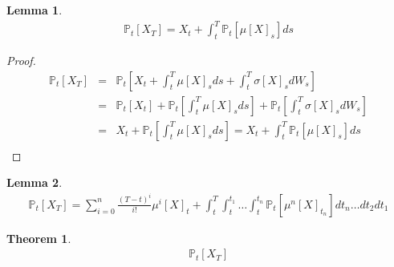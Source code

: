 \documentclass{article}
\newtheorem{thm}{Theorem}
\newtheorem{lem}{Lemma}
\newcommand{\bra}[1]{\left[#1\right]}
\renewcommand{\P}[1]{\mathbb{P}_t\bra{#1}}
\newcommand{\mub}[1]{\mu\bra{#1}}
\newcommand{\mun}[2]{\mu^{#1}\bra{#2}}
\newcommand{\sigmab}[1]{\sigma\bra{#1}}
\begin{document}
\begin{lem}
  \begin{eqnarray*}
    \P{X_T} = X_t + \int_t^T\P{\mub{X}_s}ds
  \end{eqnarray*}
\end{lem}
\begin{proof}
  \begin{eqnarray*}
    \P{X_T} & = & \P{X_t + \int_t^T \mub{X}_s ds + \int_t^T\sigmab{X}_s dW_s}\\
    & = & \P{X_t} + \P{\int_t^T \mub{X}_s ds} + \P{\int_t^T\sigmab{X}_s dW_s}\\
    & = & X_t + \P{\int_t^T \mub{X}_s ds} = X_t + \int_t^T \P{\mub{X}_s} ds\\
  \end{eqnarray*}
\end{proof}

\begin{lem}
  \begin{eqnarray*}
    \P{X_T} = \sum_{i=0}^n \frac{\left(T - t\right)^i}{i!} \mun{i}{X}_t + \int_t^T \int_t^{t_1} \ldots \int_t^{t_n} \P{\mun{n}{X}_{t_n}} dt_n \ldots dt_2 dt_1
  \end{eqnarray*}
\end{lem}

\begin{thm}
  \begin{eqnarray*}
    \P{X_T}
  \end{eqnarray*}
\end{thm}
\end{document}
